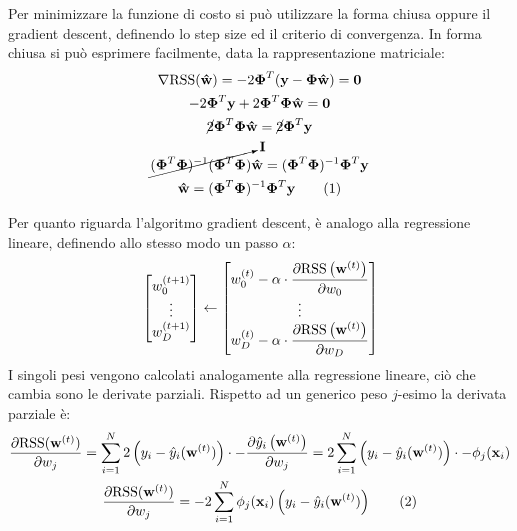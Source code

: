\documentclass{article}
\numberwithin{equation}{subsection}
\newcommand{\tageq}{\tag{\stepcounter{equation}\theequation}}
\newcommand{\vect}[1]{\boldsymbol{\mathbf{#1}}}
\begin{document}
Per minimizzare la funzione di costo si può utilizzare la forma chiusa oppure il gradient descent, definendo lo step size ed il criterio di convergenza. 
In forma chiusa si può esprimere facilmente, data la rappresentazione matriciale:
\begin{gather*}
    \nabla\text{RSS}(\vect{\hat{w}})=-2\vect{\Phi}^T(\vect{y}-\vect{\Phi}\vect{\vect{\hat{w}}})=\vect{0}\\
    -2\vect{\Phi}^T\vect{y}+2\vect{\Phi}^T\vect{\Phi}\vect{\vect{\hat{w}}}=\vect{0}\\
    \cancel{2}\vect{\Phi}^T\vect{\Phi}\vect{\vect{\hat{w}}}=\cancel{2}\vect{\Phi}^T\vect{y}\\
    \cancelto{\vect{I}}{(\vect{\Phi}^T\vect{\Phi})^{-1}(\vect{\Phi}^T\vect{\Phi})}\vect{\hat{w}}=(\vect{\Phi}^T\vect{\Phi})^{-1}\vect{\Phi}^T\vect{y}\\
    \vect{\hat{w}}=(\vect{\Phi}^T\vect{\Phi})^{-1}\vect{\Phi}^T\vect{y}\tageq
\end{gather*}


Per quanto riguarda l'algoritmo gradient descent, è analogo alla regressione lineare, 
definendo allo stesso modo un passo $\alpha$: 
\begin{equation*}
    \begin{bmatrix}
        w_0^{(t+1)}\strut\\
        \vdots\\
        w_D^{(t+1)}\strut
    \end{bmatrix}\leftarrow\begin{bmatrix}
        w_0^{(t)}-\alpha\cdot\displaystyle\frac{\partial\text{RSS}\left(\vect{w}^{(t)}\right)}{\partial w_0}\\\vdots\\
        w_D^{(t)}-\alpha\cdot\displaystyle\frac{\partial\text{RSS}\left(\vect{w}^{(t)}\right)}{\partial w_D}
    \end{bmatrix}
\end{equation*}
I singoli pesi vengono calcolati analogamente alla regressione lineare, ciò che cambia sono 
le derivate parziali. Rispetto ad un generico peso $j$-esimo la derivata parziale è:
\begin{gather*}
    \displaystyle\frac{\partial\text{RSS}(\vect{w}^{(t)})}{\partial w_j}=\sum_{i=1}^N2\left(y_i-\hat{y}_i(\vect{w}^{(t)})\right)\cdot-\frac{\partial\hat{y}_i\left(\vect{w}^{(t)}\right)}{\partial w_j}=2\sum_{i=1}^N\left(y_i-\hat{y}_i(\vect{w}^{(t)})\right)\cdot-\phi_j(\vect{x}_i)\\
    \displaystyle\frac{\partial\text{RSS}(\vect{w}^{(t)})}{\partial w_j}=-2\sum_{i=1}^N\phi_j(\vect{x}_i)\left(y_i-\hat{y}_i(\vect{w}^{(t)})\right)\tageq
\end{gather*}
\end{document}
